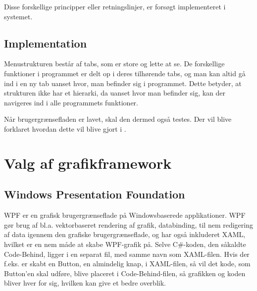 Disse forskellige principper eller retningslinjer, er forsøgt implementeret i systemet.


\subsection{Implementation}\label{sec:Implementation}

Menustrukturen består af tabs, som er store og lette at se.
De forskellige funktioner i programmet er delt op i deres tilhørende tabs, og man kan altid gå ind i en ny tab uanset hvor, man befinder sig i programmet. 
Dette betyder, at strukturen ikke har et hierarki, da uanset hvor man befinder sig, kan der navigeres ind i alle programmets funktioner.

Når brugergrænsefladen er lavet, skal den dermed også testes. 
Der vil blive forklaret hvordan dette vil blive gjort i .

\section{Valg af grafikframework} 

\subsection{Windows Presentation Foundation}
\ac{WPF} er en grafisk brugergrænseflade på Windowsbaserede applikationer.  
WPF gør brug af  bl.a. vektorbaseret rendering af grafik, databinding, til nem redigering af data igennem den grafiske brugergrænseflade, og har også inkluderet \ac{XAML}, hvilket er en nem måde at skabe WPF-grafik på. 
Selve C\#-koden, den såkaldte Code-Behind, ligger i en separat fil, med samme navn som XAML-filen. 
Hvis der f.eks. er skabt en Button, en almindelig knap, i XAML-filen, så vil det kode, som Button'en skal udføre, blive placeret i Code-Behind-filen, så grafikken og koden bliver hver for sig, hvilken kan give et bedre overblik. \citep{wpf} 

